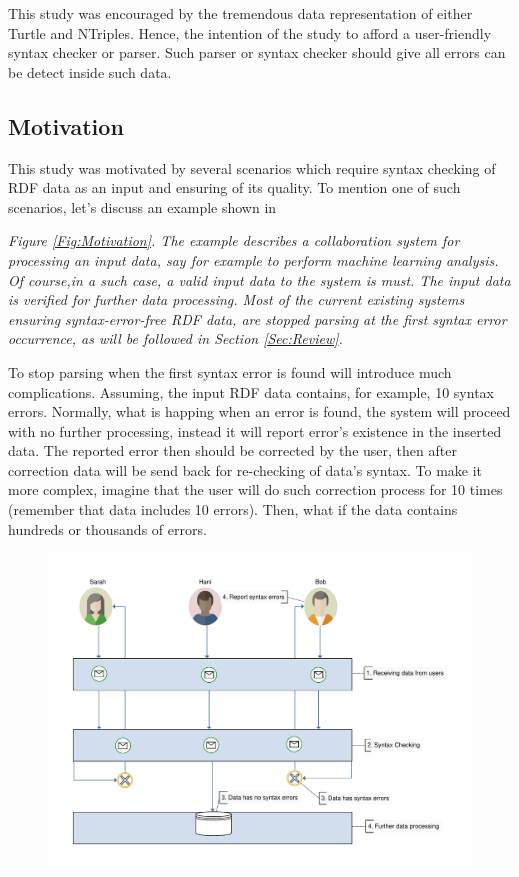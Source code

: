 \vspace{5mm} %

This study was encouraged by the tremendous data representation of either Turtle and NTriples. Hence, the intention of the study to afford a user-friendly syntax checker or parser. Such parser or syntax checker should give all errors can be detect inside such data.


			



\subsection{Motivation}

This study was motivated by several scenarios which require syntax checking of RDF data as an input and ensuring of its quality. To mention one of such scenarios, let's discuss an example shown in {\it Figure \ref{Fig:Motivation}. The example describes a collaboration system for processing an input data, say for example to perform machine learning analysis. Of course,in a such case, a valid input data to the system is must. The input data is verified for further data processing. Most of the current existing systems  ensuring syntax-error-free RDF data, are stopped parsing at the first syntax error occurrence, as will be followed in Section \ref{Sec:Review}.
	\vspace{5mm} %
	\par
	To stop parsing when the first syntax error is found will introduce much complications. Assuming, the input RDF data contains, for example, 10 syntax errors. Normally, what is happing when an error is found, the system will proceed with no further processing, instead it will report error's existence in the inserted data. The reported error then should be corrected by the user, then after correction data will be send back for re-checking of data's syntax. To make it more complex, imagine that the user will do such correction process for 10 times (remember that data includes 10 errors). Then, what if the data contains hundreds or thousands of errors. 
	\vspace{5mm} %
	\begin{figure}[ht]
		\begin{center}
			\includegraphics[scale=0.5,angle=0]{motivation}

\end{center}
\end{figure}}
